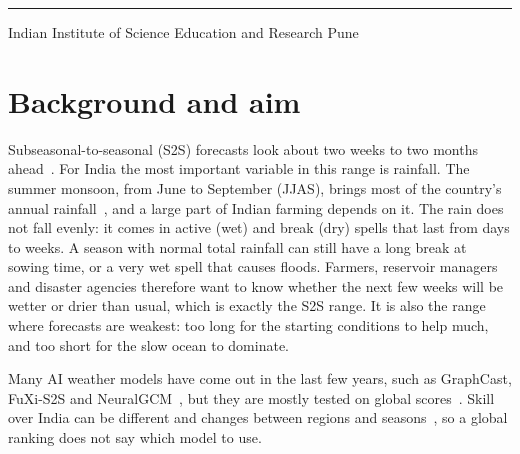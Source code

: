 \documentclass[11pt,a4paper]{article}
\newcommand{\ReportDate}{October 2026}
\begin{document}
\begin{titlepage}
\vfill
{\color{ink}\rule{\linewidth}{0.4pt}}

\vspace{0.3cm}
{\normalsize Indian Institute of Science Education and Research Pune\par}
\vspace{0.12cm}
{\small\color{ink}\scshape\expandafter\spaced\expandafter{\ReportDate}\par}
\restoregeometry
\end{titlepage}

\setcounter{page}{1}

\section{Background and aim}
Subseasonal-to-seasonal (S2S) forecasts look about two weeks to two months ahead~\cite{vitart2017s2s}. For India the most
important variable in this range is rainfall. The summer monsoon, from June to September (JJAS), brings most of the country's
annual rainfall~\cite{imd2022lpa}, and a large part of Indian farming depends on it. The rain does not fall evenly: it comes in
active (wet) and break (dry) spells that last from days to weeks. A season with normal total rainfall can still have a long break
at sowing time, or a very wet spell that causes floods. Farmers, reservoir managers and disaster agencies therefore want to know
whether the next few weeks will be wetter or drier than usual, which is exactly the S2S range. It is also the range where
forecasts are weakest: too long for the starting conditions to help much, and too short for the slow ocean to dominate.

Many AI weather models have come out in the last few years, such as GraphCast, FuXi-S2S and
NeuralGCM~\cite{lam2023graphcast,chen2024fuxis2s,kochkov2024neuralgcm}, but they are mostly tested on global
scores~\cite{rasp2024wb2}. Skill over India can be different and changes between regions and seasons~\cite{malik2024s2s}, so a
global ranking does not say which model to use.
\end{document}
